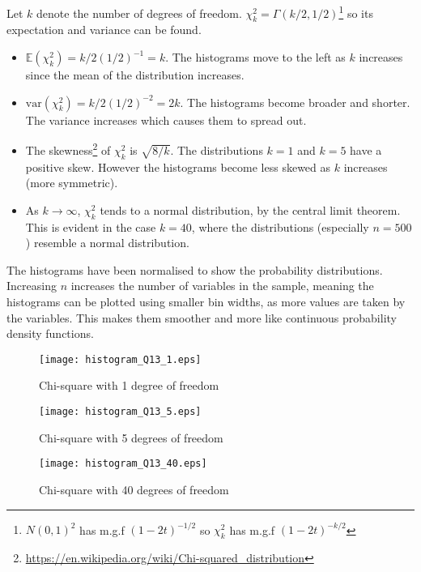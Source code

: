 \documentclass[12pt]{extarticle}
\begin{document}
Let $k$ denote the number of degrees of freedom. $\chi^2_k = \Gamma(k/2, 1/2)$\footnote{$N(0,1)^2$ has m.g.f $(1-2t)^{-1/2}$ so $\chi^2_k$ has m.g.f $(1-2t)^{-k/2}$} so its expectation and variance can be found.
\begin{itemize}
\item $\mathbb{E}(\chi^2_k) = k/2(1/2)^{-1} = k$. The histograms move to the left as $k$ increases since the mean of the distribution increases. 
\item $\mathrm{var}(\chi^2_k) = k/2(1/2)^{-2} = 2k$. The histograms become broader and shorter. The variance increases which causes them to spread out. 
\item The skewness\footnote{\url{https://en.wikipedia.org/wiki/Chi-squared_distribution}} of $\chi^2_k$ is $\sqrt{8/k}$. The distributions $k = 1$ and $k=5$ have a positive skew. However the histograms become less skewed as $k$ increases (more symmetric). 
\item As $k \rightarrow \infty$, $\chi^2_k$ tends to a normal distribution, by the central limit theorem. This is evident in the case $k=40$, where the distributions (especially $n=500$) resemble a normal distribution. 
\end{itemize}

The histograms have been normalised to show the probability distributions. Increasing $n$ increases the number of variables in the sample, meaning the histograms can be plotted using smaller bin widths, as more values are taken by the variables. This makes them smoother and more like continuous probability density functions. 

\begin{figure}[htp!]
\centering
\texttt{[image: histogram\_Q13\_1.eps]}\\
\caption{Chi-square with 1 degree of freedom }
\label{figure:7}
\end{figure} 

\begin{figure}[htp!]
\centering
\texttt{[image: histogram\_Q13\_5.eps]}\\
\caption{Chi-square with 5 degrees of freedom }
\label{figure:8}
\end{figure} 

\begin{figure}[htp!]
\centering
\texttt{[image: histogram\_Q13\_40.eps]}\\
\caption{Chi-square with 40 degrees of freedom }
\label{figure:9}
\end{figure} 
\end{document}
